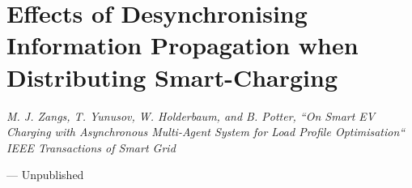 \chapter{Effects of Desynchronising Information Propagation when Distributing Smart-Charging}
\label{ch3}

\singlespacing
\epigraph{\textit{M. J. Zangs, T. Yunusov, W. Holderbaum, and B. Potter, ``On Smart EV Charging with Asynchronous Multi-Agent System for Load Profile Optimisation`` IEEE Transactions of Smart Grid}}{--- Unpublished}
\doublespacing










